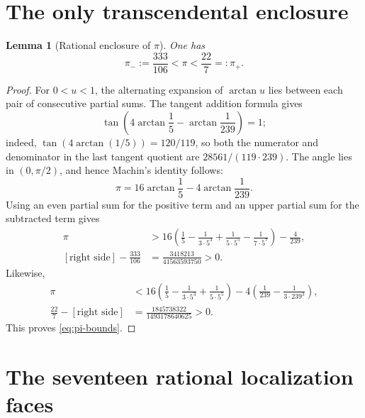 \documentclass[11pt]{article}
\newtheorem{lemma}{Lemma}
\newcommand{\pimin}{\pi_-}
\newcommand{\pimax}{\pi_+}
\begin{document}
\section{The only transcendental enclosure}

\begin{lemma}[Rational enclosure of \(\pi\)]
\label{lem:pi}
One has
\begin{equation}
 \pimin:=\frac{333}{106}<\pi<\frac{22}{7}=: \pimax.
 \label{eq:pi-bounds}
\end{equation}
\end{lemma}

\begin{proof}
For \(0<u<1\), the alternating expansion of \(\arctan u\) lies between
each pair of consecutive partial sums.  The tangent addition formula gives
\[
 \tan\!\left(4\arctan\frac15-\arctan\frac1{239}\right)=1;
\]
indeed, \(\tan(4\arctan(1/5))=120/119\), so both the numerator and
denominator in the last tangent quotient are \(28561/(119\cdot239)\).
The angle lies in \((0,\pi/2)\), and hence Machin's identity follows:
\[
 \pi=16\arctan\frac15-4\arctan\frac1{239}.
\]
Using an even partial sum for the positive term and an upper partial sum
for the subtracted term gives
\begin{align*}
 \pi
 &>16\left(\frac15-\frac1{3\cdot5^3}
       +\frac1{5\cdot5^5}-\frac1{7\cdot5^7}\right)-\frac4{239},\\
 \left[\text{right side}\right]-\frac{333}{106}
 &=\frac{3418213}{41563593750}>0.
\end{align*}
Likewise,
\begin{align*}
 \pi
 &<16\left(\frac15-\frac1{3\cdot5^3}
       +\frac1{5\cdot5^5}\right)
       -4\left(\frac1{239}-\frac1{3\cdot239^3}\right),\\
 \frac{22}{7}-\left[\text{right side}\right]
 &=\frac{1845738322}{1493178640625}>0.
\end{align*}
This proves \eqref{eq:pi-bounds}.
\end{proof}

\section{The seventeen rational localization faces}
\end{document}
